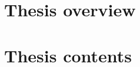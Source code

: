 \newpage

\section*{Thesis overview}

\newcommand{\actualityEN}{\underline{\textbf{\actualityTXTEN}}}
\newcommand{\progressEN}{\underline{\textbf{\progressTXTEN}}}
\newcommand{\aimEN}{\underline{{\textbf\aimTXTEN}}}
\newcommand{\tasksEN}{\underline{\textbf{\tasksTXTEN}}}
\newcommand{\noveltyEN}{\underline{\textbf{\noveltyTXTEN}}}
\newcommand{\influenceEN}{\underline{\textbf{\influenceTXTEN}}}
\newcommand{\influenceTheorEN}{\underline{\textbf{\influenceTheorTXTEN}}}
\newcommand{\methodsEN}{\underline{\textbf{\methodsTXTEN}}}
\newcommand{\defpositionsEN}{\underline{\textbf{\defpositionsTXTEN}}}
\newcommand{\reliabilityEN}{\underline{\textbf{\reliabilityTXTEN}}}
\newcommand{\probationEN}{\underline{\textbf{\probationTXTEN}}}
\newcommand{\contributionEN}{\underline{\textbf{\contributionTXTEN}}}
\newcommand{\publicationsEN}{\underline{\textbf{\publicationsTXTEN}}}
\newcommand{\researchObjectEN}{\underline{\textbf{\researchObjectTXTEN}}}
\newcommand{\researchSubjectEN}{\underline{\textbf{\researchSubjectTXTEN}}}
\newcommand{\deploymentEN}{\underline{\textbf{\deploymentTXTEN}}}
\newcommand{\thesisstructureEN}{\underline{\textbf{\thesisstructureTXTEN}}}




\section*{Thesis contents}
%


